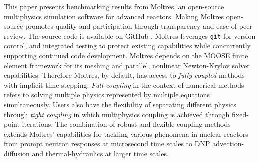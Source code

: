 This paper presents benchmarking results from Moltres, an open-source
multiphysics simulation software for advanced reactors. Making Moltres
open-source promotes quality and participation through transparency and
ease of peer review. The source code \cite{lindsay_moltres_2017} is available
on GitHub \cite{github_build_2017}. Moltres leverages \texttt{git} for
version control, and integrated testing to protect existing capabilities while
concurrently supporting continued code development. Moltres depends on the
\gls{MOOSE} finite element framework for its meshing and parallel, nonlinear
Newton-Krylov solver capabilities. Therefore Moltres, by default, has access to
\textit{fully coupled} methods with implicit time-stepping.
\textit{Full coupling} in the context of numerical methods refers to
solving multiple physics represented by multiple equations simultaneously.
Users also have the flexibility of separating different physics through
\textit{tight coupling} in which multiphysics coupling is achieved through
fixed-point iterations. The combination of robust and flexible coupling
methods extends Moltres' capabilities for tackling various phenomena in
nuclear reactors from prompt neutron responses at microsecond time scales to
\gls{DNP} advection-diffusion and thermal-hydraulics at larger time scales.
